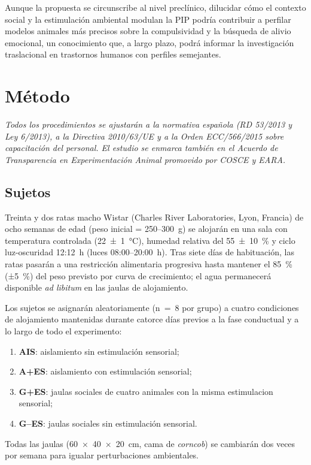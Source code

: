 \documentclass[12pt,a4paper]{article}
\begin{document}
\begin{multicols}{2}
Aunque la propuesta se circunscribe al nivel preclínico, dilucidar cómo el contexto social y la estimulación ambiental modulan la PIP podría contribuir a perfilar modelos animales más precisos sobre la compulsividad y la búsqueda de alivio emocional, un conocimiento que, a largo plazo, podrá informar la investigación traslacional en trastornos humanos con perfiles semejantes.


\section{Método}

\textit{Todos los procedimientos se ajustarán a la normativa española (RD 53/2013 y Ley 6/2013), a la Directiva 2010/63/UE y a la Orden ECC/566/2015 sobre capacitación del personal. El estudio se enmarca también en el Acuerdo de Transparencia en Experimentación Animal promovido por COSCE y EARA.}

\subsection*{Sujetos}

Treinta y dos ratas macho Wistar (Charles River Laboratories, Lyon, Francia) de ocho semanas de edad (peso inicial = 250–300~g) se alojarán en una sala con temperatura controlada (22~±~1~°C), humedad relativa del 55~±~10~\% y ciclo luz-oscuridad 12:12~h (luces 08:00–20:00~h). Tras siete días de habituación, las ratas pasarán a una restricción alimentaria progresiva hasta mantener el 85~\% (±5~\%) del peso previsto por curva de crecimiento; el agua permanecerá disponible \textit{ad libitum} en las jaulas de alojamiento.

Los sujetos se asignarán aleatoriamente (n~=~8 por grupo) a cuatro condiciones de alojamiento mantenidas durante catorce días previos a la fase conductual y a lo largo de todo el experimento: 
\begin{enumerate}
    \item \textbf{AIS}: aislamiento sin estimulación sensorial;
    \item \textbf{A+ES}: aislamiento con estimulación sensorial;
    \item \textbf{G+ES}: jaulas sociales de cuatro animales con la misma estimulacion sensorial;
    \item \textbf{G--ES}: jaulas sociales sin estimulación sensorial.
\end{enumerate}
Todas las jaulas (60~×~40~×~20~cm, cama de \textit{corncob}) se cambiarán dos veces por semana para igualar perturbaciones ambientales.


\end{multicols}
\end{document}
